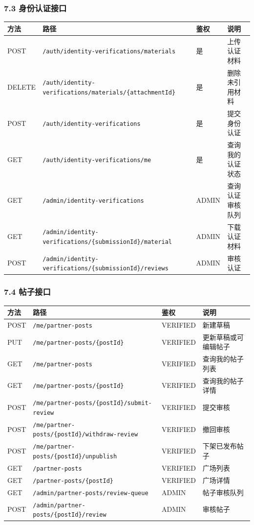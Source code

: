 \documentclass[
]{ctexart}
\begin{document}
\hypertarget{ux8eabux4efdux8ba4ux8bc1ux63a5ux53e3}{%
\subsubsection{7.3
身份认证接口}\label{ux8eabux4efdux8ba4ux8bc1ux63a5ux53e3}}

\begin{longtable}[]{@{}llll@{}}
\toprule
方法 & 路径 & 鉴权 & 说明 \\
\midrule
\endhead
POST & \texttt{/auth/identity-verifications/materials} & 是 &
上传认证材料 \\
DELETE &
\texttt{/auth/identity-verifications/materials/\{attachmentId\}} & 是 &
删除未引用材料 \\
POST & \texttt{/auth/identity-verifications} & 是 & 提交身份认证 \\
GET & \texttt{/auth/identity-verifications/me} & 是 &
查询我的认证状态 \\
GET & \texttt{/admin/identity-verifications} & ADMIN &
查询认证审核队列 \\
GET & \texttt{/admin/identity-verifications/\{submissionId\}/material} &
ADMIN & 下载认证材料 \\
POST & \texttt{/admin/identity-verifications/\{submissionId\}/reviews} &
ADMIN & 审核认证 \\
\bottomrule
\end{longtable}

\hypertarget{ux5e16ux5b50ux63a5ux53e3}{%
\subsubsection{7.4 帖子接口}\label{ux5e16ux5b50ux63a5ux53e3}}

\begin{longtable}[]{@{}llll@{}}
\toprule
方法 & 路径 & 鉴权 & 说明 \\
\midrule
\endhead
POST & \texttt{/me/partner-posts} & VERIFIED & 新建草稿 \\
PUT & \texttt{/me/partner-posts/\{postId\}} & VERIFIED &
更新草稿或可编辑帖子 \\
GET & \texttt{/me/partner-posts} & VERIFIED & 查询我的帖子列表 \\
GET & \texttt{/me/partner-posts/\{postId\}} & VERIFIED &
查询我的帖子详情 \\
POST & \texttt{/me/partner-posts/\{postId\}/submit-review} & VERIFIED &
提交审核 \\
POST & \texttt{/me/partner-posts/\{postId\}/withdraw-review} & VERIFIED
& 撤回审核 \\
POST & \texttt{/me/partner-posts/\{postId\}/unpublish} & VERIFIED &
下架已发布帖子 \\
GET & \texttt{/partner-posts} & VERIFIED & 广场列表 \\
GET & \texttt{/partner-posts/\{postId\}} & VERIFIED & 广场详情 \\
GET & \texttt{/admin/partner-posts/review-queue} & ADMIN &
帖子审核队列 \\
POST & \texttt{/admin/partner-posts/\{postId\}/review} & ADMIN &
审核帖子 \\
\bottomrule
\end{longtable}
\end{document}
